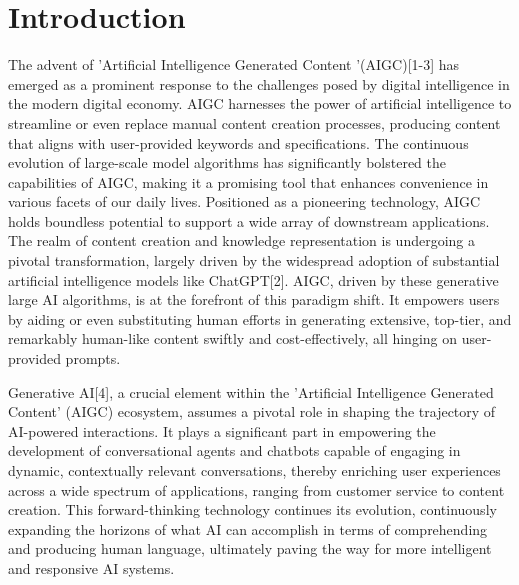 \documentclass[conference]{IEEEtran}
\begin{document}
\section{Introduction}

The advent of 'Artificial Intelligence Generated Content '(AIGC)[1-3] has emerged as a prominent response to the challenges posed by digital intelligence in the modern digital economy. AIGC harnesses the power of artificial intelligence to streamline or even replace manual content creation processes, producing content that aligns with user-provided keywords and specifications. The continuous evolution of large-scale model algorithms has significantly bolstered the capabilities of AIGC, making it a promising tool that enhances convenience in various facets of our daily lives. Positioned as a pioneering technology, AIGC holds boundless potential to support a wide array of downstream applications. The realm of content creation and knowledge representation is undergoing a pivotal transformation, largely driven by the widespread adoption of substantial artificial intelligence models like ChatGPT[2]. AIGC, driven by these generative large AI algorithms, is at the forefront of this paradigm shift. It empowers users by aiding or even substituting human efforts in generating extensive, top-tier, and remarkably human-like content swiftly and cost-effectively, all hinging on user-provided prompts. 

\baselineskip

Generative AI[4], a crucial element within the 'Artificial Intelligence Generated Content' (AIGC) ecosystem, assumes a pivotal role in shaping the trajectory of AI-powered interactions. It plays a significant part in empowering the development of conversational agents and chatbots capable of engaging in dynamic, contextually relevant conversations, thereby enriching user experiences across a wide spectrum of applications, ranging from customer service to content creation. This forward-thinking technology continues its evolution, continuously expanding the horizons of what AI can accomplish in terms of comprehending and producing human language, ultimately paving the way for more intelligent and responsive AI systems.
\end{document}
